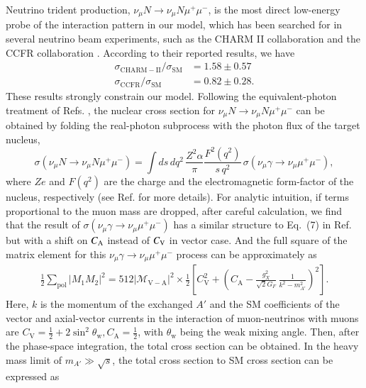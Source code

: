 \documentclass[onecolumn, aps, nofootinbib, prd, preprint, floats, floatfix, amsmath, amssymb, superscriptaddress, preprintnumbers]{revtex4-1}
\newcommand{\zb}[1]{{\color{blue} {#1}}}
\begin{document}
Neutrino trident production, \zb{$\nu_\mu N\to \nu_\mu N\mu^+\mu^-$}, is the most direct low-energy probe of the interaction pattern in our model, which has been searched for in several neutrino beam experiments, such as the CHARM II collaboration \cite{geiregat1990first} and the CCFR collaboration \cite{CCFR:1991lpl}. According to their reported results, we have 
\begin{equation}
\begin{aligned}
\sigma_{\mathrm{CHARM}-\mathrm{II}} / \sigma_{\mathrm{SM}} & =1.58 \pm 0.57 \\
\sigma_{\mathrm{CCFR}} / \sigma_{\mathrm{SM}} & =0.82 \pm 0.28.
\end{aligned}
\end{equation}
These results strongly constrain our model.
Following the equivalent-photon treatment of Refs. \cite{Williams:1934ad,Belusevic:1987cw,Altmannshofer:2014pba}, the nuclear cross section for $\nu_\mu N\to \nu_\mu N\mu^+\mu^-$ can be obtained by folding the real-photon subprocess with the photon flux of the target nucleus,
\begin{equation}
\sigma(\nu_\mu N\to\nu_\mu N\mu^+\mu^-)
=\int ds\,dq^2\,
\frac{Z^2\alpha}{\pi}\frac{F^2(q^2)}{s\,q^2}\,
\sigma(\nu_\mu\gamma\to\nu_\mu\mu^+\mu^-),
\label{eq:trident-epa}
\end{equation}
where $Ze$ and $F(q^2)$ are the charge and the electromagnetic form-factor of the nucleus, respectively (see Ref. \cite{Altmannshofer:2014pba} for more details).
For analytic intuition, if terms proportional to the muon mass are dropped, after careful calculation, we find that the result of $\sigma(\nu_\mu\gamma\to\nu_\mu\mu^+\mu^-)$ has a similar structure to Eq.~(7) in Ref.~\cite{Altmannshofer:2014pba} but with a shift on $C_{\rm A}$ instead of $C_{\rm V}$ in vector case.
And the full square of the matrix element for this $\nu_\mu\gamma\to\nu_\mu\mu^+\mu^-$ process can be approximately as
\begin{equation}
\begin{aligned}
\frac{1}{2} \sum_{\mathrm{pol}}\left|M_1 M_2\right|^2=512\left|\mathcal{M}_{\mathrm{V}-\mathrm{A}}\right|^2 \times \frac{1}{2}\left[C_{\mathrm{V}}^2+\left(C_{\mathrm{A}}-\frac{g_X^2}{\sqrt2G_F}\,
\frac{1}{k^2-m_{A'}^2}\right)^2 \right].
\end{aligned}
\end{equation}
Here, $k$ is the momentum of the exchanged $A'$ and the SM coefficients of the vector and axial-vector currents in the interaction of muon-neutrinos with muons are $C_{\mathrm{V}}=\frac{1}{2}+ 2 \sin ^2 \theta_{\mathrm{w}}, C_{\mathrm{A}}=\frac{1}{2}$, with $\theta_{\mathrm{w}}$ being the weak mixing angle. Then, after the phase-space integration, the total cross section can be obtained. In the heavy mass limit of $m_{A'}\gg\sqrt{s}$, the total cross section to SM cross section can be expressed as
\end{document}

